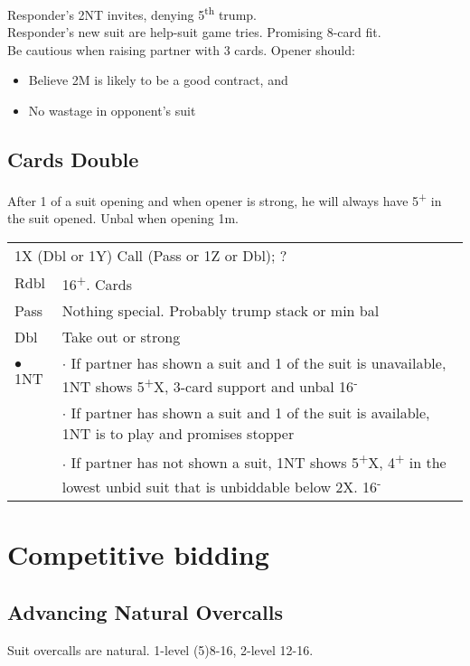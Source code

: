 \documentclass{article}
\newcommand{\nt}{\relsize{-1}NT\relsize{1}}
\newcommand{\up}{\textsuperscript{+}}
\newcommand{\down}{\textsuperscript{-}}
\newcommand{\al}{$\bullet$}
\begin{document}
Responder's 2\nt{} invites, denying 5\textsuperscript{th} trump. \\
Responder's new suit are help-suit game tries. Promising 8-card fit. \\
Be cautious when raising partner with 3 cards. Opener should:
\begin{itemize}
	\itemsep0em
	\item Believe 2M is likely to be a good contract, and
	\item No wastage in opponent's suit
\end{itemize}

\subsection{Cards Double}
After 1 of a suit opening and when opener is strong, he will always have 5\up{} in the suit opened. Unbal when opening 1m. \\

\begin{tabular}{|l|p{6.5cm}}
	\multicolumn{2}{l}{1X (Dbl or 1Y) Call (Pass or 1Z or Dbl); ?} \\
	Rdbl & 16\up{}. Cards \\
	Pass & Nothing special. Probably trump stack or min bal \\
	Dbl & Take out or strong \\
	\al{}1\nt{} &  $\cdot$ If partner has shown a suit and 1 of the suit is unavailable, 1\nt{} shows 5\up{}X, 3-card support and unbal 16\down{} \\
	 &  $\cdot$ If partner has shown a suit and 1 of the suit is available, 1\nt{} is to play and promises stopper \\
	 &  $\cdot$ If partner has not shown a suit, 1\nt{} shows 5\up{}X, 4\up{} in the lowest unbid suit that is unbiddable below 2X. 16\down{} \\
\end{tabular}
\section{Competitive bidding}

\subsection{Advancing Natural Overcalls}
Suit overcalls are natural. 1-level (5)8-16, 2-level 12-16. \\
\end{document}
